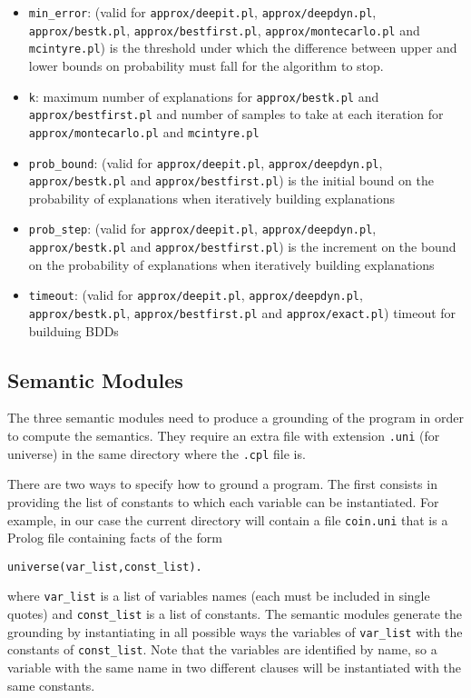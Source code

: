 \documentclass[a4paper,10pt]{article}
\begin{document}
\begin{itemize}
\item \verb|min_error|: (valid for \texttt{approx/deepit.pl}, \texttt{approx/deepdyn.pl}, \texttt{approx/bestk.pl}, \texttt{approx/bestfirst.pl}, \texttt{approx/montecarlo.pl} and \texttt{mcintyre.pl}) is the threshold under which the difference between upper and lower bounds on probability must fall for the algorithm to stop.
\item \verb|k|: maximum number of explanations  for \texttt{approx/bestk.pl} and \texttt{approx/bestfirst.pl} and number of samples to take at each iteration for \texttt{approx/montecarlo.pl} and \texttt{mcintyre.pl}
\item \verb|prob_bound|: (valid for \texttt{approx/deepit.pl}, \texttt{approx/deepdyn.pl}, \texttt{approx/bestk.pl} and \texttt{approx/bestfirst.pl}) is the initial bound on the probability of explanations when iteratively building explanations
\item \verb|prob_step|: (valid for \texttt{approx/deepit.pl}, \texttt{approx/deepdyn.pl}, \texttt{approx/bestk.pl} and \texttt{approx/bestfirst.pl}) is the increment on the bound on the probability of explanations when iteratively building explanations
\item \verb|timeout|: (valid for \texttt{approx/deepit.pl}, \texttt{approx/deepdyn.pl}, \texttt{approx/bestk.pl}, \texttt{approx/bestfirst.pl} and \texttt{approx/exact.pl}) timeout for builduing BDDs
\end{itemize}

\subsection{Semantic Modules}
The three semantic modules need to produce a grounding of the program in order to compute the semantics.
They require an extra file with extension \texttt{.uni} (for universe) in the same directory where the \texttt{.cpl} file is.

There are two ways to specify how to ground a program. The first consists in providing  the list of constants to which each variable can be instantiated. For example, in our case the current directory will contain a file \texttt{coin.uni} that is a Prolog file containing facts of the form
\begin{verbatim}
universe(var_list,const_list).
\end{verbatim}
where \verb|var_list| is a list of variables names (each must be included in single quotes) and \verb|const_list| is a list of constants. The semantic modules generate the grounding by instantiating in all possible ways the variables of \verb|var_list| with the constants of \verb|const_list|. Note that the variables are identified by name, so a variable with the same name in two different clauses will be instantiated with the same constants.
\end{document}
